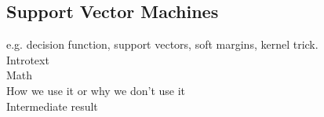 \subsection{Support Vector Machines}

e.g. decision function, support vectors, soft margins, kernel trick.\\

Introtext\\

Math\\

How we use it or why we don't use it\\

Intermediate result\\

